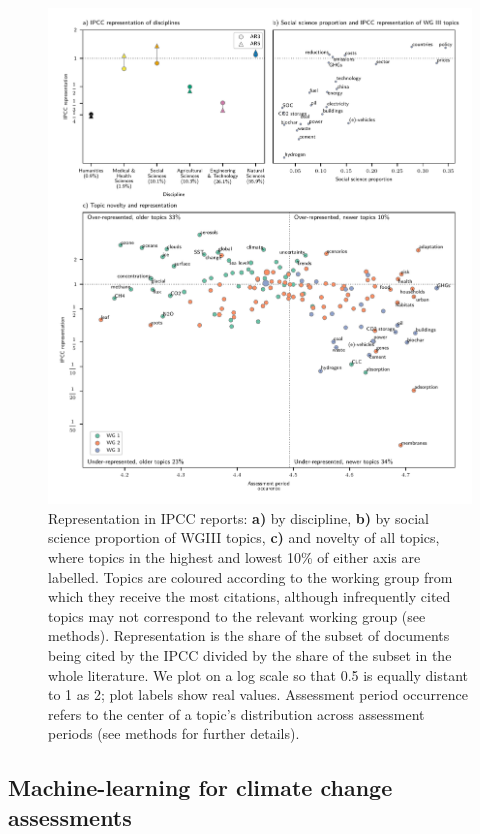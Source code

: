 \documentclass{article}
\begin{document}
\begin{linenumbers}
		
		\begin{figure}[htp]
			\begin{center}
				\includegraphics[width=180mm]{../plots_pub/big_panel_representation.pdf}
				\caption{Representation in IPCC reports: \textbf{a)} by discipline, \textbf{b)} by social science proportion of WGIII topics, \textbf{c)} and novelty of all topics, where topics in the highest and lowest 10\% of either axis are labelled. Topics are coloured according to the working group from which they receive the most citations, although infrequently cited topics may not correspond to the relevant working group (see methods). Representation is the share of the subset of documents being cited by the IPCC divided by the share of the subset in the whole literature. We plot on a log scale so that 0.5 is equally distant to 1 as 2; plot labels show real values. Assessment period occurrence refers to the center of a topic's distribution across assessment periods (see methods for further details).}
				\label{oecd_rep}
			\end{center}
		\end{figure}
		
		
		\subsection*{Machine-learning for climate change assessments}
		

\end{linenumbers}
\end{document}
